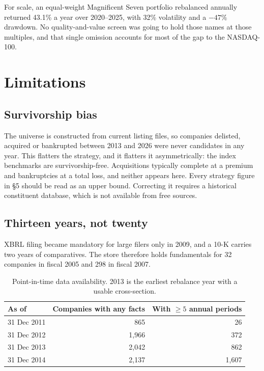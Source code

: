 \documentclass[11pt,a4paper]{article}
\begin{document}
For scale, an equal-weight Magnificent Seven portfolio rebalanced annually
returned 43.1\% a year over 2020--2025, with 32\% volatility and a $-47\%$
drawdown. No quality-and-value screen was going to hold those names at those
multiples, and that single omission accounts for most of the gap to the
NASDAQ-100.

\section{Limitations}

\subsection{Survivorship bias}

The universe is constructed from current listing files, so companies delisted,
acquired or bankrupted between 2013 and 2026 were never candidates in any year.
This flatters the strategy, and it flatters it asymmetrically: the index
benchmarks are survivorship-free. Acquisitions typically complete at a premium
and bankruptcies at a total loss, and neither appears here. Every strategy
figure in \S5 should be read as an upper bound. Correcting it requires a
historical constituent database, which is not available from free sources.

\subsection{Thirteen years, not twenty}

XBRL filing became mandatory for large filers only in 2009, and a 10-K carries
two years of comparatives. The store therefore holds fundamentals for 32
companies in fiscal 2005 and 298 in fiscal 2007.

\begin{table}[h]
\centering
\sffamily\small
\begin{tabular}{@{}lrr@{}}
\toprule
\textbf{As of} & \textbf{Companies with any facts} & \textbf{With $\geq5$ annual periods}\\
\midrule
31 Dec 2011 & 865 & 26\\
31 Dec 2012 & 1,966 & 372\\
31 Dec 2013 & 2,042 & 862\\
31 Dec 2014 & 2,137 & 1,607\\
\bottomrule
\end{tabular}
\caption{Point-in-time data availability. 2013 is the earliest rebalance year
with a usable cross-section.}
\end{table}
\end{document}
